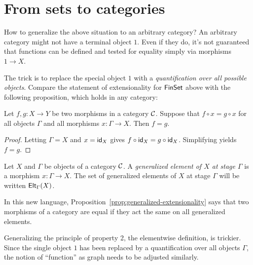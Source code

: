 

\section{From sets to categories}

How to generalize the above situation to an arbitrary category?
An arbitrary category might not have a terminal object \(1\).
Even if they do, it's not guaranteed that functions can be
defined and tested for equality simply via morphisms \(1 \to X\).

The trick is to replace the special object \(1\)
with a \emph{quantification over all possible objects}.
Compare the statement of extensionality for \(\mathsf{FinSet}\)
above with the following proposition, which holds in any category:

\begin{proposition} \label{prop:generalized-extensionality}
  Let \(f,g : X \to Y\) be two morphisms in a category \(\mathcal C\).
  Suppose that \(f \circ x = g \circ x\) for all objects \(\Gamma\)
  and all morphisms \(x : \Gamma \to X\).
  Then \(f = g\).
\end{proposition}
\begin{proof}
  Letting \(\Gamma = X\) and \(x = \mathsf{id}_X\) gives \(f \circ \mathsf{id}_X = g \circ \mathsf{id}_X\).
  Simplifying yields \(f = g\).
\end{proof}

\begin{definition}
  Let \(X\) and \(\Gamma\) be objects of a category \(\mathcal C\).
  A \emph{generalized element of \(X\) at stage \(\Gamma\)}
  is a morphism \(x : \Gamma \to X\).
  The set of generalized elements of \(X\) at stage \(\Gamma\)
  will be written \(\mathsf{Elt}_{\Gamma}(X)\).
\end{definition}

In this new language, Proposition~\ref{prop:generalized-extensionality}
says that two morphisms of a category are equal if
they act the same on all generalized elements.

Generalizing the principle of property 2, the elementwise definition,
is trickier. Since the single object \(1\) has been replaced by a quantification over
all objects \(\Gamma\), the notion of ``function'' as graph
needs to be adjusted similarly.

